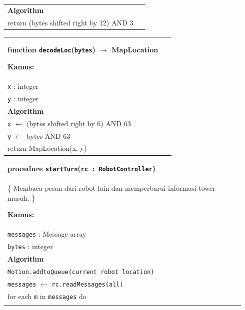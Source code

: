 \documentclass{article}
\newenvironment{pseudobox}
{
\centering
\begin{longtable}{|p{0.94\linewidth}|}
\hline
}
{
\\ \hline
\end{longtable}
\vspace{0.05cm}
}
\begin{document}
\begin{enumerate}[label=\alph*.]
\begin{pseudobox}
\textbf{Algorithm} \\

\hspace*{1.5em}return (bytes shifted right by 12) AND 3
\end{pseudobox}

\begin{pseudobox}
\textbf{function \texttt{decodeLoc}(\texttt{bytes}) $\rightarrow$ MapLocation}

\textbf{Kamus:} \\
\hspace*{1.5em}\texttt{x} : integer \\
\hspace*{1.5em}\texttt{y} : integer \\

\textbf{Algorithm} \\

\hspace*{1.5em}\texttt{x} $\leftarrow$ (bytes shifted right by 6) AND 63 \\
\hspace*{1.5em}\texttt{y} $\leftarrow$ bytes AND 63 \\

\hspace*{1.5em}return MapLocation(x, y)
\end{pseudobox}

\begin{pseudobox}
\textbf{procedure \texttt{startTurn}(\texttt{rc : RobotController})} \\
\{ Membaca pesan dari robot lain dan memperbarui informasi tower musuh. \}

\textbf{Kamus:} \\
\hspace*{1.5em}\texttt{messages} : Message array \\
\hspace*{1.5em}\texttt{bytes} : integer \\

\textbf{Algorithm} \\

\hspace*{1.5em}\texttt{Motion.addtoQueue(current robot location)} \\

\hspace*{1.5em}\texttt{messages} $\leftarrow$ \texttt{rc.readMessages(all)} \\

\hspace*{1.5em}for each \texttt{m} in \texttt{messages} do \\


\end{pseudobox}
\end{enumerate}
\end{document}
